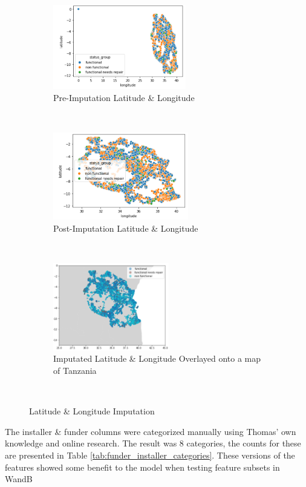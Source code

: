 \documentclass[conference]{IEEEtran}
\begin{document}
\begin{figure}[t!]
  \centering
  \begin{subfigure}[t]{0.3\textwidth}
      \centering
      \includegraphics[height=1.45in]{figures/tom_impute_lat_1}
      \caption{Pre-Imputation Latitude \& Longitude}
  \end{subfigure}%
  ~
  \begin{subfigure}[t]{0.3\textwidth}
      \centering
      \includegraphics[height=1.5in]{figures/tom_impute_lat_2}
      \caption{Post-Imputation Latitude \& Longitude}
  \end{subfigure}
  ~
  \begin{subfigure}[t]{0.3\textwidth}
      \centering
      \includegraphics[height=1.5in]{figures/tom_impute_lat_3}
      \caption{Imputated Latitude \& Longitude Overlayed onto a map of Tanzania}
  \end{subfigure}
  ~
  \caption{Latitude \& Longitude Imputation}
  \label{fig:lat_long_imputation}
\end{figure}

The installer \& funder columns were categorized manually using Thomas' own knowledge and online research. The result was 8 categories, the counts for these are presented in Table \ref{tab:funder_installer_categories}. These versions of the features showed some benefit to the model when testing feature subsets in WandB
\end{document}
